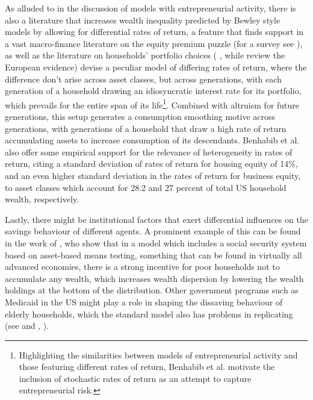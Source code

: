 As alluded to in the discussion of models with entrepreneurial activity, there is
also a literature that increases wealth inequality predicted by Bewley style
models by allowing for differential rates of return, a feature that finds 
support in a vast macro-finance literature on the equity premium puzzle (for 
a survey see \cite{SiegelThaler1997}), as well as the literature on households'
portfolio choices ( , while \citet{GuisoHaliassosJiappeli2003} review the 
European evidence)
\citet{BenhabibBisinZhu2011} devise a peculiar model of differing rates of return,
where the difference don't arise across asset classes, but across generations,
with each generation of a household drawing an idiosyncratic interest rate for 
its portfolio, which prevails for the entire span of its life\footnote{Highlighting
the similarities between models of entrepreneurial activity and those featuring 
different rates of return, Benhabib et al. motivate the inclusion of stochastic
rates of return as an attempt to capture entrepreneurial risk.}. Combined with 
altruism for future generations, this setup generates a consumption smoothing 
motive across generations, with generations of a household that draw a high 
rate of return accumulating assets to increase consumption of its descendants. 
Benhabib et al. also offer some empirical support for the relevance of 
heterogeneity in rates of return, citing a standard deviation of rates of return
for housing equity of 14\%, and an even higher standard deviation in the rates
of return for business equity, to asset classes which account for 28.2 and 27
percent of total US household wealth, respectively. 

Lastly, there might be institutional factors that exert differential influences
on the savings behaviour of different agents. A prominent example of this can
be found in the work of \citet{HubbardSkinnerZeldes1995}, who show that in a 
model which includes a social security system based on asset-based means 
testing, something that can be found in virtually all advanced economies, 
there is a strong incentive for poor households not to accumulate any wealth,
which increases wealth dispersion by lowering the wealth holdings at the bottom
of the distribution. Other government programs such as Medicaid in the US might
play a role in shaping the dissaving behaviour of elderly households, which the 
standard model also has problems in replicating (see \citet{DeNardiFrenchJones2009}
and \citeyear{DeNardiFrenchJones2010}, \citet{DeNardiFrenchJonesMcCauley2015}).  


